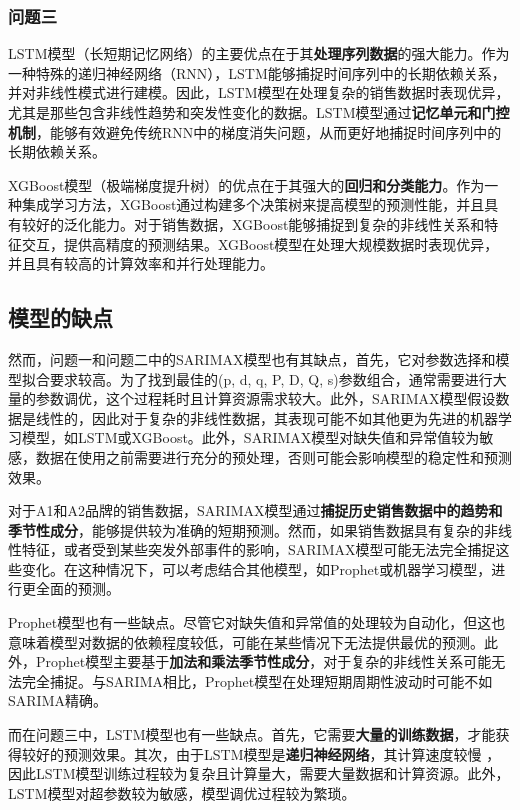 \documentclass[a4paper]{article}
\begin{document}
	\subsubsection{问题三}
	LSTM模型（长短期记忆网络）的主要优点在于其\textbf{处理序列数据}的强大能力。作为一种特殊的递归神经网络（RNN），LSTM能够捕捉时间序列中的长期依赖关系，并对非线性模式进行建模。因此，LSTM模型在处理复杂的销售数据时表现优异，尤其是那些包含非线性趋势和突发性变化的数据。LSTM模型通过\textbf{记忆单元和门控机制}，能够有效避免传统RNN中的梯度消失问题，从而更好地捕捉时间序列中的长期依赖关系。
	
	XGBoost模型（极端梯度提升树）的优点在于其强大的\textbf{回归和分类能力}。作为一种集成学习方法，XGBoost通过构建多个决策树来提高模型的预测性能，并且具有较好的泛化能力。对于销售数据，XGBoost能够捕捉到复杂的非线性关系和特征交互，提供高精度的预测结果。XGBoost模型在处理大规模数据时表现优异，并且具有较高的计算效率和并行处理能力。
	
	\subsection{模型的缺点}
	然而，问题一和问题二中的SARIMAX模型也有其缺点，首先，它对参数选择和模型拟合要求较高。为了找到最佳的(p, d, q, P, D, Q, s)参数组合，通常需要进行大量的参数调优，这个过程耗时且计算资源需求较大。此外，SARIMAX模型假设数据是线性的，因此对于复杂的非线性数据，其表现可能不如其他更为先进的机器学习模型，如LSTM或XGBoost。此外，SARIMAX模型对缺失值和异常值较为敏感，数据在使用之前需要进行充分的预处理，否则可能会影响模型的稳定性和预测效果。

	对于A1和A2品牌的销售数据，SARIMAX模型通过\textbf{捕捉历史销售数据中的趋势和季节性成分}，能够提供较为准确的短期预测。然而，如果销售数据具有复杂的非线性特征，或者受到某些突发外部事件的影响，SARIMAX模型可能无法完全捕捉这些变化。在这种情况下，可以考虑结合其他模型，如Prophet或机器学习模型，进行更全面的预测。
	
	Prophet模型也有一些缺点。尽管它对缺失值和异常值的处理较为自动化，但这也意味着模型对数据的依赖程度较低，可能在某些情况下无法提供最优的预测。此外，Prophet模型主要基于\textbf{加法和乘法季节性成分}，对于复杂的非线性关系可能无法完全捕捉。与SARIMA相比，Prophet模型在处理短期周期性波动时可能不如SARIMA精确。
	
	而在问题三中，LSTM模型也有一些缺点。首先，它需要\textbf{大量的训练数据}，才能获得较好的预测效果。其次，由于LSTM模型是\textbf{递归神经网络}，其计算速度较慢
	，因此LSTM模型训练过程较为复杂且计算量大，需要大量数据和计算资源。此外，LSTM模型对超参数较为敏感，模型调优过程较为繁琐。
	
\end{document}
